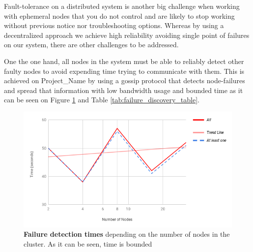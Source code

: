 Fault-tolerance on a distributed system is another big challenge when working with ephemeral nodes that you do not control and are likely to stop working without previous notice nor troubleshooting options. Whereas by using a decentralized approach we achieve high reliability avoiding single point of failures on our system, there are other challenges to be addressed.

One the one hand, all nodes in the system must be able to reliably detect other faulty nodes to avoid expending time trying to communicate with them. This is achieved on Project\_Name by using a gossip protocol that detects node-failures and spread that information with low bandwidth usage and bounded time as it can be seen on Figure \ref{fig:failure_discovery_chart} and Table \ref{tab:failure_discovery_table}.

\begin{figure}[h!]
		\centering
    	\includegraphics[width=\linewidth]{assets/images/Failure-detection-time.png}
    	\caption{\textbf{Failure detection times} depending on the number of nodes in the cluster. As it can be seen, time is bounded}
    	\label{fig:failure_discovery_chart}
\end{figure}

